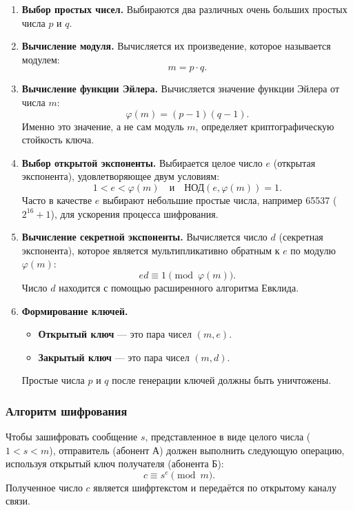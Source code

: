\begin{enumerate}
    \item \textbf{Выбор простых чисел.} Выбираются два различных очень больших простых числа $p$ и $q$.
    
    \item \textbf{Вычисление модуля.} Вычисляется их произведение, которое называется модулем: 
    \[ m = p \cdot q. \]
    
    \item \textbf{Вычисление функции Эйлера.} Вычисляется значение функции Эйлера от числа $m$:
    \[ \varphi(m) = (p-1)(q-1). \]
    Именно это значение, а не сам модуль $m$, определяет криптографическую стойкость ключа.
    
    \item \textbf{Выбор открытой экспоненты.} Выбирается целое число $e$ (открытая экспонента), удовлетворяющее двум условиям:
    \[ 1 < e < \varphi(m) \quad \text{и} \quad \text{НОД}(e, \varphi(m)) = 1. \]
    Часто в качестве $e$ выбирают небольшие простые числа, например 65537 ($2^{16}+1$), для ускорения процесса шифрования.
    
    \item \textbf{Вычисление секретной экспоненты.} Вычисляется число $d$ (секретная экспонента), которое является мультипликативно обратным к $e$ по модулю $\varphi(m)$:
    \[ ed \equiv 1 \pmod{\varphi(m)}. \]
    Число $d$ находится с помощью расширенного алгоритма Евклида.
    
    \item \textbf{Формирование ключей.}
    \begin{itemize}
        \item \textbf{Открытый ключ} — это пара чисел $(m, e)$.
        \item \textbf{Закрытый ключ} — это пара чисел $(m, d)$.
    \end{itemize}
    Простые числа $p$ и $q$ после генерации ключей должны быть уничтожены.
\end{enumerate}

\subsubsection{Алгоритм шифрования}
Чтобы зашифровать сообщение $s$, представленное в виде целого числа ($1 < s < m$), отправитель (абонент А) должен выполнить следующую операцию, используя открытый ключ получателя (абонента Б):
\[ c \equiv s^e \pmod m. \]
Полученное число $c$ является шифртекстом и передаётся по открытому каналу связи.

